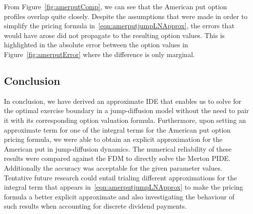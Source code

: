 From Figure~\ref{fig:amerputComp}, we can see that the American put option profiles overlap quite closely. Despite the assumptions that were made in order to simplify the pricing formula in~\eqref{eqn:amerputjumpLNApprox}, the errors that would have arose did not propagate to the resulting option values. This is highlighted in the absolute error between the option values in Figure~\ref{fig:amerputError} where the difference is only marginal.

\subsection{Conclusion}
In conclusion, we have derived an approximate IDE that enables us to solve for the optimal exercise boundary in a jump-diffusion model without the need to pair it with its corresponding option valuation formula. Furthermore, upon setting an approximate term for one of the integral terms for the American put option pricing formula, we were able to obtain an explicit approximation for the American put in jump-diffusion dynamics. The numerical reliability of these results were compared against the FDM to directly solve the Merton PIDE. Additionally the accuracy was acceptable for the given parameter values. Tentative future research could entail trialing different approximations for the integral term that appears in~\eqref{eqn:amerputjumpLNApprox} to make the pricing formula a better explicit approximate and also investigating the behaviour of such results when accounting for discrete dividend payments.